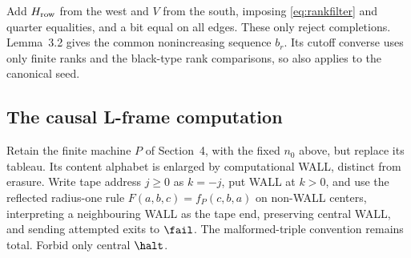 Add $H_{\rm row}$ from the west and $V$ from the south, imposing \eqref{eq:rankfilter} and quarter equalities, and a bit equal on all edges. These only reject completions. Lemma~3.2 gives the common nonincreasing sequence $b_r$. Its cutoff converse uses only finite ranks and the black-type rank comparisons, so also applies to the canonical seed.

\subsection{The causal L-frame computation}

Retain the finite machine $P$ of Section~4, with the fixed $n_0$ above, but replace its tableau. Its content alphabet is enlarged by computational WALL, distinct from erasure. Write tape address $j\ge0$ as $k=-j$, put WALL at $k>0$, and use the reflected radius-one rule $F(a,b,c)=f_P(c,b,a)$ on non-WALL centers, interpreting a neighbouring WALL as the tape end, preserving central WALL, and sending attempted exits to $\fail$. The malformed-triple convention remains total. Forbid only central $\halt$.

